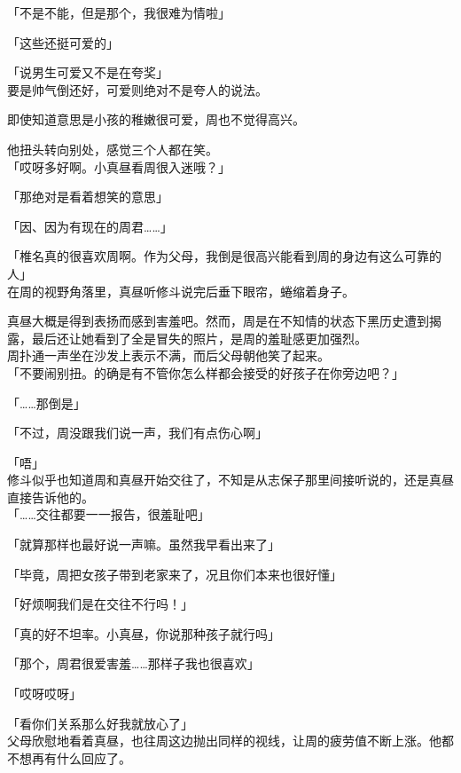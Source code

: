「不是不能，但是那个，我很难为情啦」

「这些还挺可爱的」

「说男生可爱又不是在夸奖」\\

要是帅气倒还好，可爱则绝对不是夸人的说法。

即使知道意思是小孩的稚嫩很可爱，周也不觉得高兴。

他扭头转向别处，感觉三个人都在笑。\\

「哎呀多好啊。小真昼看周很入迷哦？」

「那绝对是看着想笑的意思」

「因、因为有现在的周君……」

「椎名真的很喜欢周啊。作为父母，我倒是很高兴能看到周的身边有这么可靠的人」\\

在周的视野角落里，真昼听修斗说完后垂下眼帘，蜷缩着身子。

真昼大概是得到表扬而感到害羞吧。然而，周是在不知情的状态下黑历史遭到揭露，最后还让她看到了全是冒失的照片，是周的羞耻感更加强烈。\\

周扑通一声坐在沙发上表示不满，而后父母朝他笑了起来。\\

「不要闹别扭。的确是有不管你怎么样都会接受的好孩子在你旁边吧？」

「……那倒是」

「不过，周没跟我们说一声，我们有点伤心啊」

「唔」\\

修斗似乎也知道周和真昼开始交往了，不知是从志保子那里间接听说的，还是真昼直接告诉他的。\\

「……交往都要一一报告，很羞耻吧」

「就算那样也最好说一声嘛。虽然我早看出来了」

「毕竟，周把女孩子带到老家来了，况且你们本来也很好懂」

「好烦啊我们是在交往不行吗！」

「真的好不坦率。小真昼，你说那种孩子就行吗」

「那个，周君很爱害羞……那样子我也很喜欢」

「哎呀哎呀」

「看你们关系那么好我就放心了」\\

父母欣慰地看着真昼，也往周这边抛出同样的视线，让周的疲劳值不断上涨。他都不想再有什么回应了。\\

